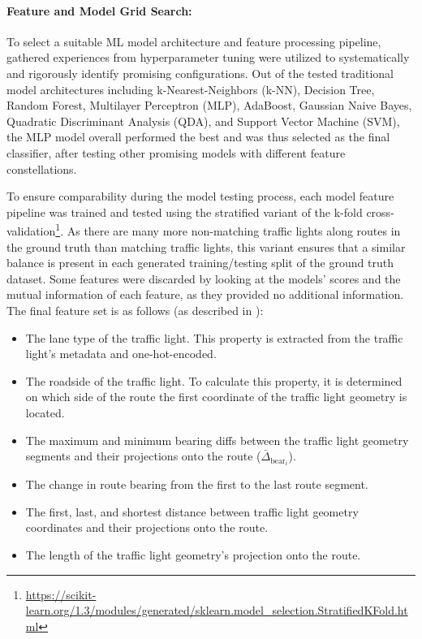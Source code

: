 \paragraph{Feature and Model Grid Search:} To select a suitable ML model architecture and feature processing pipeline, gathered experiences from hyperparameter tuning were utilized to systematically and rigorously identify promising configurations. Out of the tested traditional model architectures including k-Nearest-Neighbors (k-NN), Decision Tree, Random Forest, Multilayer Perceptron (MLP), AdaBoost, Gaussian Naive Bayes, Quadratic Discriminant Analysis (QDA), and Support Vector Machine (SVM), the MLP model overall performed the best and was thus selected as the final classifier, after testing other promising models with different feature constellations. 

To ensure comparability during the model testing process, each model feature pipeline was trained and tested using the stratified variant of the k-fold cross-validation\footnote{\url{https://scikit-learn.org/1.3/modules/generated/sklearn.model_selection.StratifiedKFold.html}}. As there are many more non-matching traffic lights along routes in the ground truth than matching traffic lights, this variant ensures that a similar balance is present in each generated training/testing split of the ground truth dataset. Some features were discarded by looking at the models' scores and the mutual information of each feature, as they provided no additional information. The final feature set is as follows (as described in \cite{matthes2023geo}):

\begin{itemize}
    \item The lane type of the traffic light. This property is extracted from the traffic light's metadata and one-hot-encoded.
    \item The roadside of the traffic light. To calculate this property, it is determined on which side of the route the first coordinate of the traffic light geometry is located.
    \item The maximum and minimum bearing diffs between the traffic light geometry segments and their projections onto the route ($\bar{\Delta}_{\text{bear}_i}$).
    \item The change in route bearing from the first to the last route segment. 
    \item The first, last, and shortest distance between traffic light geometry coordinates and their projections onto the route.
    \item The length of the traffic light geometry's projection onto the route.
\end{itemize}

